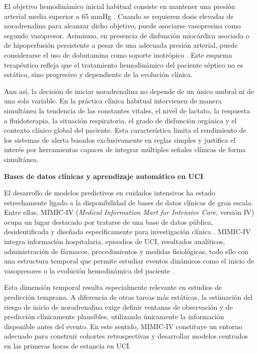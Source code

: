El objetivo hemodinámico inicial habitual consiste en mantener una presión arterial media superior a 65 mmHg \cite{evans2021,hubu2025}. Cuando se requieren dosis elevadas de noradrenalina para alcanzar dicho objetivo, puede asociarse vasopresina como segundo vasopresor. Asimismo, en presencia de disfunción miocárdica asociada o de hipoperfusión persistente a pesar de una adecuada presión arterial, puede considerarse el uso de dobutamina como soporte inotrópico \cite{evans2021,hubu2025}. Este esquema terapéutico refleja que el tratamiento hemodinámico del paciente séptico no es estático, sino progresivo y dependiente de la evolución clínica.

Aun así, la decisión de iniciar noradrenalina no depende de un único umbral ni de una sola variable. En la práctica clínica habitual intervienen de manera simultánea la tendencia de las constantes vitales, el nivel de lactato, la respuesta a fluidoterapia, la situación respiratoria, el grado de disfunción orgánica y el contexto clínico global del paciente. Esta característica limita el rendimiento de los sistemas de alerta basados exclusivamente en reglas simples y justifica el interés por herramientas capaces de integrar múltiples señales clínicas de forma simultánea.

\textbf{Bases de datos clínicas y aprendizaje automático en UCI}

El desarrollo de modelos predictivos en cuidados intensivos ha estado estrechamente ligado a la disponibilidad de bases de datos clínicas de gran escala. Entre ellas, MIMIC-IV (\textit{Medical Information Mart for Intensive Care}, versión IV) ocupa un lugar destacado por tratarse de una base de datos pública, desidentificada y diseñada específicamente para investigación clínica \cite{johnson2023}. MIMIC-IV integra información hospitalaria, episodios de UCI, resultados analíticos, administración de fármacos, procedimientos y medidas fisiológicas, todo ello con una estructura temporal que permite estudiar eventos dinámicos como el inicio de vasopresores o la evolución hemodinámica del paciente \cite{johnson2023}.

Esta dimensión temporal resulta especialmente relevante en estudios de predicción temprana. A diferencia de otras tareas más estáticas, la estimación del riesgo de inicio de noradrenalina exige definir ventanas de observación y de predicción clínicamente plausibles, utilizando únicamente la información disponible antes del evento. En este sentido, MIMIC-IV constituye un entorno adecuado para construir cohortes retrospectivas y desarrollar modelos centrados en las primeras horas de estancia en UCI.

